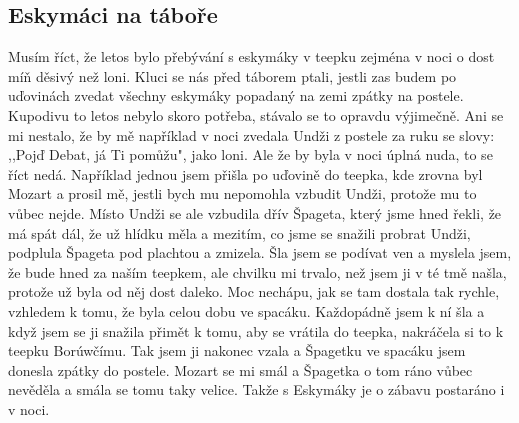 \subsection*{Eskymáci na táboře} %
\label{sub:eskymáci_na_táboře}

Musím říct, že letos bylo přebývání s eskymáky v teepku zejména v noci o dost míň děsivý než loni. Kluci se nás před táborem ptali, jestli zas budem po uďovinách zvedat všechny eskymáky popadaný na zemi zpátky na postele. Kupodivu to letos nebylo skoro potřeba, stávalo se to opravdu výjimečně. Ani se mi nestalo, že by mě například v noci zvedala Undži z postele za ruku se slovy: ,,Pojď Debat, já Ti pomůžu", jako loni. Ale že by byla v noci úplná nuda, to se říct nedá. Například jednou jsem přišla po uďovině do teepka, kde zrovna byl Mozart a prosil mě, jestli bych mu nepomohla vzbudit Undži, protože mu to vůbec nejde. Místo Undži se ale vzbudila dřív Špageta, který jsme hned řekli, že má spát dál, že už hlídku měla a mezitím, co jsme se snažili probrat Undži, podplula Špageta pod plachtou a zmizela. Šla jsem se podívat ven a myslela jsem, že bude hned za naším teepkem, ale chvilku mi trvalo, než jsem ji v té tmě našla, protože už byla od něj dost daleko. Moc nechápu, jak se tam dostala tak rychle, vzhledem k tomu, že byla celou dobu ve spacáku. Každopádně jsem k ní šla a když jsem se ji snažila přimět k tomu, aby se vrátila do teepka, nakráčela si to k teepku Borúwčímu. Tak jsem ji nakonec vzala a Špagetku ve spacáku jsem donesla zpátky do postele. Mozart se mi smál a Špagetka o tom ráno vůbec nevěděla a smála se tomu taky velice. Takže s Eskymáky je o zábavu postaráno i v noci.

